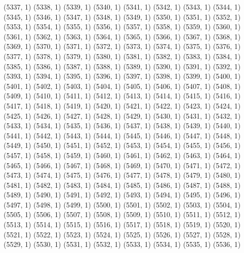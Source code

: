 {   (5337, 1)
   (5338, 1)
   (5339, 1)
   (5340, 1)
   (5341, 1)
   (5342, 1)
   (5343, 1)
   (5344, 1)
   (5345, 1)
   (5346, 1)
   (5347, 1)
   (5348, 1)
   (5349, 1)
   (5350, 1)
   (5351, 1)
   (5352, 1)
   (5353, 1)
   (5354, 1)
   (5355, 1)
   (5356, 1)
   (5357, 1)
   (5358, 1)
   (5359, 1)
   (5360, 1)
   (5361, 1)
   (5362, 1)
   (5363, 1)
   (5364, 1)
   (5365, 1)
   (5366, 1)
   (5367, 1)
   (5368, 1)
   (5369, 1)
   (5370, 1)
   (5371, 1)
   (5372, 1)
   (5373, 1)
   (5374, 1)
   (5375, 1)
   (5376, 1)
   (5377, 1)
   (5378, 1)
   (5379, 1)
   (5380, 1)
   (5381, 1)
   (5382, 1)
   (5383, 1)
   (5384, 1)
   (5385, 1)
   (5386, 1)
   (5387, 1)
   (5388, 1)
   (5389, 1)
   (5390, 1)
   (5391, 1)
   (5392, 1)
   (5393, 1)
   (5394, 1)
   (5395, 1)
   (5396, 1)
   (5397, 1)
   (5398, 1)
   (5399, 1)
   (5400, 1)
   (5401, 1)
   (5402, 1)
   (5403, 1)
   (5404, 1)
   (5405, 1)
   (5406, 1)
   (5407, 1)
   (5408, 1)
   (5409, 1)
   (5410, 1)
   (5411, 1)
   (5412, 1)
   (5413, 1)
   (5414, 1)
   (5415, 1)
   (5416, 1)
   (5417, 1)
   (5418, 1)
   (5419, 1)
   (5420, 1)
   (5421, 1)
   (5422, 1)
   (5423, 1)
   (5424, 1)
   (5425, 1)
   (5426, 1)
   (5427, 1)
   (5428, 1)
   (5429, 1)
   (5430, 1)
   (5431, 1)
   (5432, 1)
   (5433, 1)
   (5434, 1)
   (5435, 1)
   (5436, 1)
   (5437, 1)
   (5438, 1)
   (5439, 1)
   (5440, 1)
   (5441, 1)
   (5442, 1)
   (5443, 1)
   (5444, 1)
   (5445, 1)
   (5446, 1)
   (5447, 1)
   (5448, 1)
   (5449, 1)
   (5450, 1)
   (5451, 1)
   (5452, 1)
   (5453, 1)
   (5454, 1)
   (5455, 1)
   (5456, 1)
   (5457, 1)
   (5458, 1)
   (5459, 1)
   (5460, 1)
   (5461, 1)
   (5462, 1)
   (5463, 1)
   (5464, 1)
   (5465, 1)
   (5466, 1)
   (5467, 1)
   (5468, 1)
   (5469, 1)
   (5470, 1)
   (5471, 1)
   (5472, 1)
   (5473, 1)
   (5474, 1)
   (5475, 1)
   (5476, 1)
   (5477, 1)
   (5478, 1)
   (5479, 1)
   (5480, 1)
   (5481, 1)
   (5482, 1)
   (5483, 1)
   (5484, 1)
   (5485, 1)
   (5486, 1)
   (5487, 1)
   (5488, 1)
   (5489, 1)
   (5490, 1)
   (5491, 1)
   (5492, 1)
   (5493, 1)
   (5494, 1)
   (5495, 1)
   (5496, 1)
   (5497, 1)
   (5498, 1)
   (5499, 1)
   (5500, 1)
   (5501, 1)
   (5502, 1)
   (5503, 1)
   (5504, 1)
   (5505, 1)
   (5506, 1)
   (5507, 1)
   (5508, 1)
   (5509, 1)
   (5510, 1)
   (5511, 1)
   (5512, 1)
   (5513, 1)
   (5514, 1)
   (5515, 1)
   (5516, 1)
   (5517, 1)
   (5518, 1)
   (5519, 1)
   (5520, 1)
   (5521, 1)
   (5522, 1)
   (5523, 1)
   (5524, 1)
   (5525, 1)
   (5526, 1)
   (5527, 1)
   (5528, 1)
   (5529, 1)
   (5530, 1)
   (5531, 1)
   (5532, 1)
   (5533, 1)
   (5534, 1)
   (5535, 1)
   (5536, 1)
}
